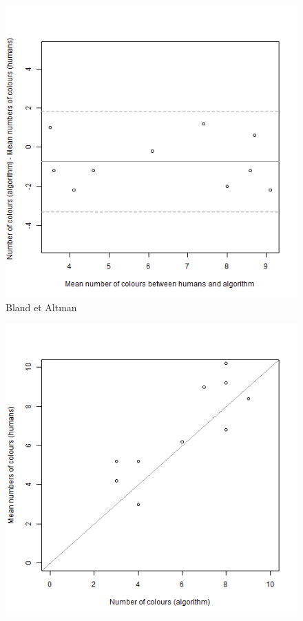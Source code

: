 \documentclass[11pt,a4paper]{article}
\begin{document}
\begin{figure}[h!]
	\centering
	\includegraphics[width=\linewidth]{figures/comp_nb_colours_agreement.png}
	\caption{Bland et Altman}
	\label{}
\end{figure}
\begin{figure}[h!]
	\centering
	\includegraphics[width=\linewidth]{figures/comp_nb_colours_scatter.png}
	\caption{ }
	\label{}
\end{figure}
\end{document}
